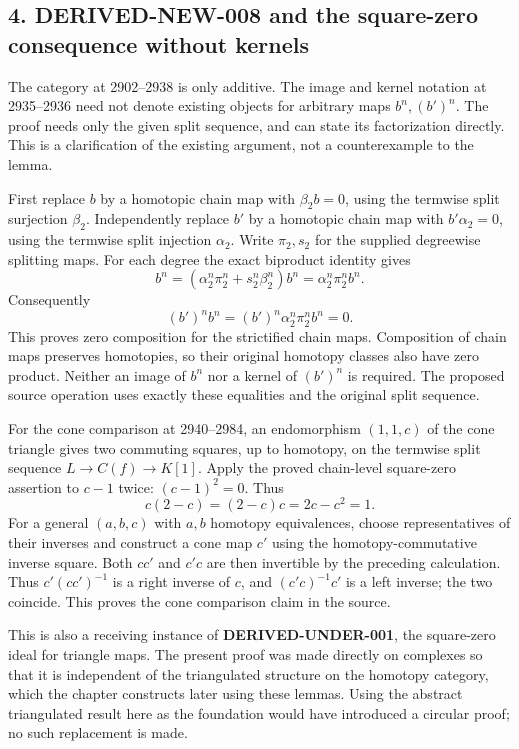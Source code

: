 \documentclass[11pt]{article}
\begin{document}
\subsection{4. DERIVED-NEW-008 and the square-zero consequence without kernels}\label{proofs-2419-2994-derived-new-008-and-the-square-zero-consequence-without-kernels}

The category at 2902–\allowbreak{}2938 is only additive. The image and kernel notation at 2935–\allowbreak{}2936 need not denote existing objects for arbitrary maps \(b^n,(b')^n\). The proof needs only the given split sequence,\allowbreak{} and can state its factorization directly. This is a clarification of the existing argument,\allowbreak{} not a counterexample to the lemma.

First replace \(b\) by a homotopic chain map with \(\beta_2b=0\),\allowbreak{} using the termwise split surjection \(\beta_2\). Independently replace \(b'\) by a homotopic chain map with \(b'\alpha_2=0\),\allowbreak{} using the termwise split injection \(\alpha_2\). Write \(\pi_2,s_2\) for the supplied degreewise splitting maps. For each degree the exact biproduct identity gives \[
b^n=(\alpha_2^n\pi_2^n+s_2^n\beta_2^n)b^n
=\alpha_2^n\pi_2^nb^n.
\] Consequently \[
(b')^nb^n=(b')^n\alpha_2^n\pi_2^nb^n=0.
\] This proves zero composition for the strictified chain maps. Composition of chain maps preserves homotopies,\allowbreak{} so their original homotopy classes also have zero product. Neither an image of \(b^n\) nor a kernel of \((b')^n\) is required. The proposed source operation uses exactly these equalities and the original split sequence.

For the cone comparison at 2940–\allowbreak{}2984,\allowbreak{} an endomorphism \((1,1,c)\) of the cone triangle gives two commuting squares,\allowbreak{} up to homotopy,\allowbreak{} on the termwise split sequence \(L\to C(f)\to K[1]\). Apply the proved chain-level square-zero assertion to \(c-1\) twice:\allowbreak{} \((c-1)^2=0\). Thus \[
c(2-c)=(2-c)c=2c-c^2=1.
\] For a general \((a,b,c)\) with \(a,b\) homotopy equivalences,\allowbreak{} choose representatives of their inverses and construct a cone map \(c'\) using the homotopy-commutative inverse square. Both \(cc'\) and \(c'c\) are then invertible by the preceding calculation. Thus \(c' (cc')^{-1}\) is a right inverse of \(c\),\allowbreak{} and \((c'c)^{-1}c'\) is a left inverse; the two coincide. This proves the cone comparison claim in the source.

This is also a receiving instance of \textbf{DERIVED-UNDER-001},\allowbreak{} the square-zero ideal for triangle maps. The present proof was made directly on complexes so that it is independent of the triangulated structure on the homotopy category,\allowbreak{} which the chapter constructs later using these lemmas. Using the abstract triangulated result here as the foundation would have introduced a circular proof; no such replacement is made.
\clearpage
\end{document}
